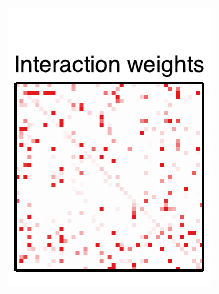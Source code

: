 \documentclass[aos,noinfoline]{imsart} %
\begin{document}
\begin{figure}[t!]
\begin{subfigure}[T]{1.2in}
    \includegraphics[width=\textwidth]{network1}
  \end{subfigure}
  ~
  \begin{subfigure}[T]{1.2in}

\end{subfigure}
\end{figure}
\end{document}
